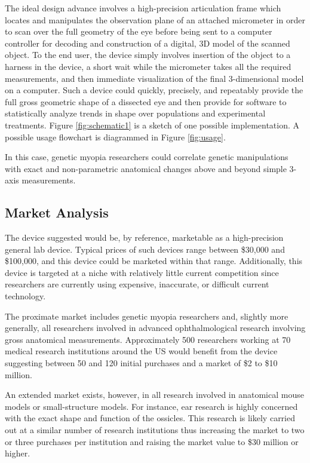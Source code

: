 \documentclass{article}
\begin{document}
The ideal design advance involves a high-precision articulation frame which locates and manipulates the observation plane of an attached micrometer in order to scan over the full geometry of the eye before being sent to a computer controller for decoding and construction of a digital, 3D model of the scanned object. To the end user, the device simply involves insertion of the object to a harness in the device, a short wait while the micrometer takes all the required measurements, and then immediate visualization of the final 3-dimensional model on a computer. Such a device could quickly, precisely, and repeatably provide the full gross geometric shape of a dissected eye and then provide for software to statistically analyze trends in shape over populations and experimental treatments. Figure \ref{fig:schematic1} is a sketch of one possible implementation. A possible usage flowchart is diagrammed in Figure \ref{fig:usage}.

In this case, genetic myopia researchers could correlate genetic
manipulations with exact and non-parametric anatomical changes above
and beyond simple 3-axis measurements.

\subsection{Market Analysis}
\label{sec:market-analysis}

The device suggested would be, by reference, marketable as a
high-precision general lab device. Typical prices of such devices range between
\$30,000 and \$100,000, and this device could be marketed within that
range. Additionally, this device is targeted at a niche with
relatively little current competition since researchers are currently using expensive, inaccurate, or difficult current technology.

The proximate market includes genetic myopia researchers and, slightly
more generally, all researchers involved in advanced ophthalmological
research involving gross anatomical measurements. Approximately 500
researchers working at 70 medical research institutions around the US
would benefit from the device suggesting between 50 and 120 initial
purchases and a market of \$2 to \$10 million.

An extended market exists, however, in all research involved in
anatomical mouse models or small-structure models. For instance,
ear research is highly concerned with the exact shape and function of
the ossicles. This research is likely carried out at a similar number
of research institutions thus increasing the market to two or three
purchases per institution and raising the market value to \$30 million
or higher.
\end{document}
